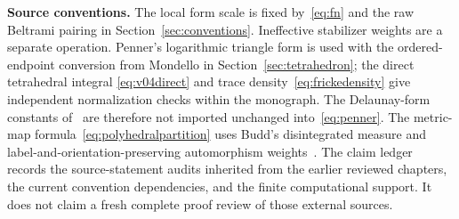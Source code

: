 \noindent\textbf{Source conventions.}
The local form scale is fixed by~\eqref{eq:fn} and the raw Beltrami
pairing in Section~\ref{sec:conventions}. Ineffective stabilizer weights
are a separate operation. Penner's logarithmic triangle form is used
with the ordered-endpoint conversion from Mondello in
Section~\ref{sec:tetrahedron}; the direct tetrahedral integral
\eqref{eq:v04direct} and trace density~\eqref{eq:frickedensity} give
independent normalization checks within the monograph.
The Delaunay-form constants of~\cite[Sections~3.2.3--3.2.4]{CDE}
are therefore not imported unchanged into~\eqref{eq:penner}.
The metric-map formula~\eqref{eq:polyhedralpartition} uses Budd's
disintegrated measure and label-and-orientation-preserving
automorphism weights~\cite[Section~1.1 and Corollary~2]{Budd}.
The claim ledger  records the
source-statement audits inherited from the earlier reviewed chapters,
the current convention dependencies, and the finite computational
support. It does not claim a fresh complete proof review of those
external sources.
